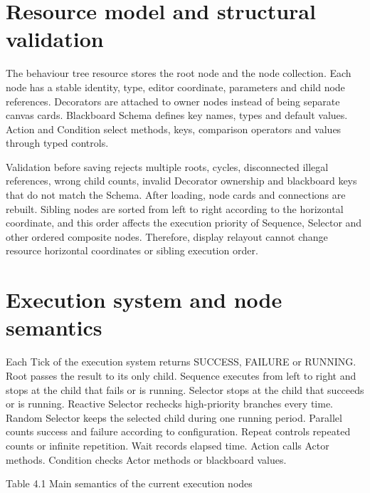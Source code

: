 \documentclass[11pt,a4paper,oneside,extrafontsizes]{memoir}
\begin{document}
\section{Resource model and structural validation}

The behaviour tree resource stores the root node and the node collection. Each node has a stable identity, type, editor coordinate, parameters and child node references. Decorators are attached to owner nodes instead of being separate canvas cards. Blackboard Schema defines key names, types and default values. Action and Condition select methods, keys, comparison operators and values through typed controls.

Validation before saving rejects multiple roots, cycles, disconnected illegal references, wrong child counts, invalid Decorator ownership and blackboard keys that do not match the Schema. After loading, node cards and connections are rebuilt. Sibling nodes are sorted from left to right according to the horizontal coordinate, and this order affects the execution priority of Sequence, Selector and other ordered composite nodes. Therefore, display relayout cannot change resource horizontal coordinates or sibling execution order.

\section{Execution system and node semantics}

Each Tick of the execution system returns SUCCESS, FAILURE or RUNNING. Root passes the result to its only child. Sequence executes from left to right and stops at the child that fails or is running. Selector stops at the child that succeeds or is running. Reactive Selector rechecks high-priority branches every time. Random Selector keeps the selected child during one running period. Parallel counts success and failure according to configuration. Repeat controls repeated counts or infinite repetition. Wait records elapsed time. Action calls Actor methods. Condition checks Actor methods or blackboard values.

Table 4.1 Main semantics of the current execution nodes
\end{document}
